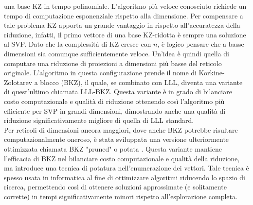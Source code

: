 una base KZ in tempo polinomiale. L'algoritmo più veloce conosciuto richiede un tempo
di computazione esponenziale rispetto alla dimensione. 
Per compensare a tale problema KZ apporta un 
grande vantaggio in rispetto all'accuratezza della riduzione, infatti, il primo vettore
di una base KZ-ridotta è sempre una soluzione al SVP. Dato che la complessità di KZ
cresce con $n$, è logico pensare che a basse dimensioni sia comunque sufficientemente
veloce. Un'idea è quindi quella di computare
una riduzione di proiezioni a dimensioni più basse del reticolo originale.
L'algoritmo in questa configurazione prende il nome di Korkine-Zolotarev a blocco (BKZ), 
il quale, se combinato con LLL, diventa una variante di quest'ultimo chiamata LLL-BKZ. Questa
variante è in grado di bilanciare costo computazionale e qualità di riduzione ottenendo così
l'algoritmo più efficiente per SVP in grandi dimensioni, dimostrando anche una qualità di riduzione
significativamente migliore di quella di LLL standard. \\

Per reticoli di dimensioni ancora maggiori, dove anche BKZ potrebbe risultare computazionalmente oneroso, 
è stata sviluppata una versione ulteriormente ottimizzata chiamata BKZ "pruned" o potata \cite{BKZPRUNED}. Questa variante 
mantiene l'efficacia di BKZ nel bilanciare costo computazionale e qualità della riduzione, 
ma introduce una tecnica di potatura nell'enumerazione dei vettori. Tale tecnica è spesso usata in 
informatica al fine di ottimizzare algoritmi riducendo lo spazio di ricerca, permettendo così di ottenere 
soluzioni approssimate (e solitamente corrette) in tempi significativamente minori rispetto all'esplorazione completa.